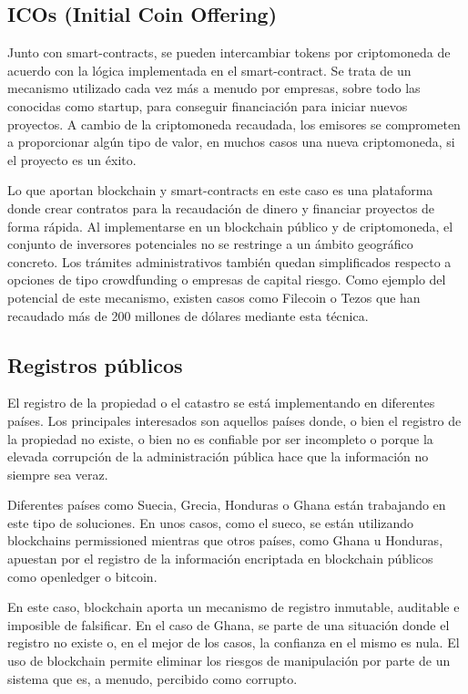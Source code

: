 \documentclass[conference]{IEEEtran}
\begin{document}
\subsection{ICOs (Initial Coin Offering)}

Junto con smart-contracts, se pueden intercambiar tokens por criptomoneda de acuerdo con la lógica implementada en el smart-contract. Se trata de un mecanismo utilizado cada vez más a menudo por empresas, sobre todo las conocidas como startup, para conseguir financiación para iniciar nuevos proyectos. A cambio de la criptomoneda recaudada, los emisores se comprometen a proporcionar algún tipo de valor, en muchos casos una nueva criptomoneda, si el proyecto es un éxito. \cite{blockchain4}

Lo que aportan blockchain y smart-contracts en este caso es una plataforma donde crear contratos para la recaudación de dinero y financiar proyectos de forma rápida. Al implementarse en un blockchain público y de criptomoneda, el conjunto de inversores potenciales no se restringe a un ámbito geográfico concreto. Los trámites administrativos también quedan simplificados respecto a opciones de tipo crowdfunding o empresas de capital riesgo. Como ejemplo del potencial de este mecanismo, existen casos como Filecoin o Tezos que han recaudado más de 200 millones de dólares mediante esta técnica.

\subsection{Registros públicos}

El registro de la propiedad o el catastro se está implementando en diferentes países. Los principales interesados son aquellos países donde, o bien el registro de la propiedad no existe, o bien no es confiable por ser incompleto o porque la elevada corrupción de la administración pública hace que la información no siempre sea veraz.

Diferentes países como Suecia, Grecia, Honduras o Ghana están trabajando en este tipo de soluciones. En unos casos, como el sueco, se están utilizando blockchains permissioned mientras que otros países, como Ghana u Honduras, apuestan por el registro de la información encriptada en blockchain públicos como openledger o bitcoin.

En este caso, blockchain aporta un mecanismo de registro inmutable, auditable e imposible de falsificar. En el caso de Ghana, se parte de una situación donde el registro no existe o, en el mejor de los casos, la confianza en el mismo es nula. El uso de blockchain permite eliminar los riesgos de manipulación por parte de un sistema que es, a menudo, percibido como corrupto.
\end{document}
